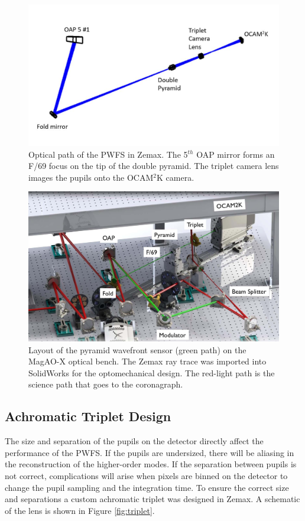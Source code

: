 \begin{figure}
    \centering
    \includegraphics[width=.8\textwidth]{Chapter Materials/Chapter Three Materials/layout.jpg}
    \caption{Optical path of the PWFS in Zemax. The 5$^{th}$ OAP mirror forms an F/69 focus on the tip of the double pyramid. The triplet camera lens images the pupils onto the OCAM$^2$K camera.}
    \label{fig:my_label}
\end{figure}

\begin{figure}
    \centering
    \includegraphics[width=.8\textwidth]{Chapter Materials/Chapter Three Materials/PWFSOptoMech.jpg}
    \caption{Layout of the pyramid wavefront sensor (green path) on the MagAO-X optical bench. The Zemax ray trace was imported into SolidWorks for the optomechanical design. The red-light path is the science path that goes to the coronagraph.}
    \label{fig:oplayout}
\end{figure}
	
	
	
	
\subsection{Achromatic Triplet Design}

The size and separation of the pupils on the detector directly affect the performance of the PWFS. If the pupils are undersized, there will be aliasing in the reconstruction of the higher-order modes. If the separation between pupils is not correct, complications will arise when pixels are binned on the detector to change the pupil sampling and the integration time.  To ensure the correct size and separations a custom achromatic triplet was designed in Zemax. A schematic of the lens is shown in Figure \ref{fig:triplet}. 

